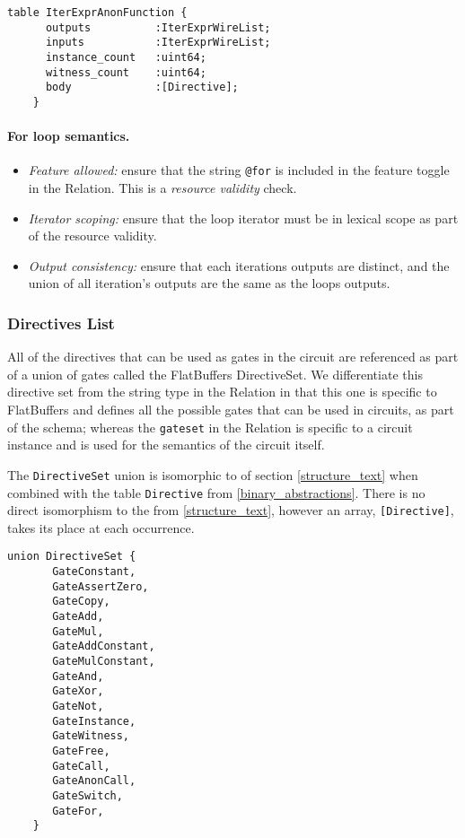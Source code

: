 \begin{lstlisting}[style=fbslisting]
    table IterExprAnonFunction {
      outputs          :IterExprWireList;
      inputs           :IterExprWireList;
      instance_count   :uint64;
      witness_count    :uint64;
      body             :[Directive];
    }
\end{lstlisting}

\paragraph{For loop semantics.}
\begin{itemize}
    \item \textit{Feature allowed:} ensure that the string \texttt{@for} is included in the feature toggle in the \textsf{Relation}. This is a \textit{resource validity} check.
    \item \textit{Iterator scoping:} ensure that the loop iterator must be in lexical scope as part of the resource validity.
    \item \textit{Output consistency:} ensure that each iterations outputs are distinct, and the union of all iteration's outputs are the same as the loops outputs.
\end{itemize}


\subsubsection*{Directives List}

All of the directives that can be used as gates in the circuit are referenced as part of a union of gates called the FlatBuffers \textsf{DirectiveSet}. We differentiate this directive set from the string type in the \textsf{Relation} in that this one is specific to FlatBuffers and defines all the possible gates that can be used in circuits, as part of the schema; whereas the \texttt{gateset} in the \textsf{Relation} is specific to a circuit instance and is used for the semantics of the circuit itself. 

The \texttt{DirectiveSet} union is isomorphic to  of section \ref{structure_text} when combined with the table \texttt{Directive} from \ref{binary_abstractions}. There is no direct isomorphism to the  from \ref{structure_text}, however an array, \texttt{[Directive]}, takes its place at each occurrence.

\begin{lstlisting}[style=fbslisting]
    union DirectiveSet {
       GateConstant,
       GateAssertZero,
       GateCopy,
       GateAdd,
       GateMul,
       GateAddConstant,
       GateMulConstant,
       GateAnd,
       GateXor,
       GateNot,
       GateInstance,
       GateWitness,
       GateFree,
       GateCall,
       GateAnonCall,
       GateSwitch,
       GateFor,
    }
\end{lstlisting}

